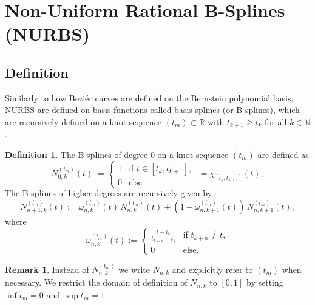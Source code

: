 \documentclass[a4paper, 11pt]{report}
\theoremstyle{definition}
\newtheorem{definition}{Definition}[section]
\newtheorem*{remark}{Remark}
\begin{document}
\section{Non-Uniform Rational B-Splines (NURBS)}
\subsection{Definition}
Similarly to how Beziér curves are defined on the Bernstein polynomial basis, NURBS are defined on basis functions called basis splines (or B-splines), which are recursively defined on a knot sequence $(t_m) \subset \mathbb{R}$ with $t_{k+1} \geq t_k$ for all $k \in \mathbb{N}$.

\begin{definition}
	The B-splines of degree $0$ on a knot sequence $(t_m)$ are defined as
	\begin{equation}
		N^{(t_m)}_{0,k}(t) :=
		\begin{cases}
			1 & \text{if } t \in [t_k, t_{k+1}],\\
			0 & \text{else}
		\end{cases}
		\; = \chi_{[t_k, t_{k+1}]}(t),
	\end{equation}
	The B-splines of higher degrees are recursively given by
	\begin{equation}
		N_{n+1,k}^{(t_m)}(t) := \omega^{(t_m)}_{n, k}(t) \, N^{(t_m)}_{n, k}(t) + (1-\omega^{(t_m)}_{n, k+1}(t)) \, N^{(t_m)}_{n, k+1}(t),
	\end{equation}
	where
	\begin{equation}
		\omega^{(t_m)}_{n,k}(t) := 
		\begin{cases}
			\frac{t-t_k}{t_{k+n} - t_k} &\text{if } t_{k+n} \neq t,\\
			0 							&\text{else.}
		\end{cases}
	\end{equation}
\end{definition}

\begin{remark}
	Instead of $N_{n,k}^{(t_m)}$ we write $N_{n,k}$ and explicitly refer to $(t_m)$ when necessary. We restrict the domain of definition of $N_{n,k}$ to $[0, 1]$ by setting $\inf t_m = 0$ and $\sup t_m = 1$.
\end{remark}
\end{document}
